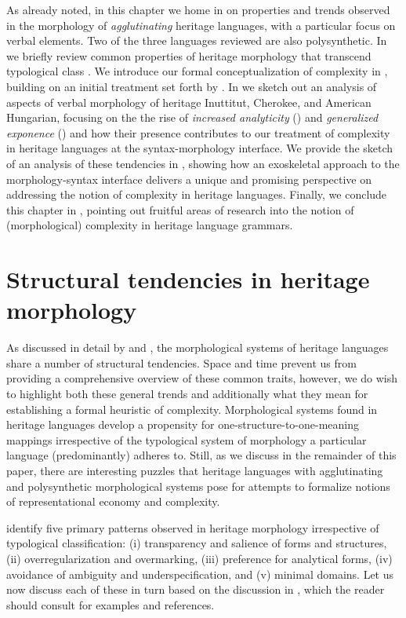 \documentclass[output=paper,colorlinks,citecolor=brown,footheight=42pt]{langscibook}
\begin{document}
As already noted, in this chapter we home in on properties and trends observed in the morphology of \textit{agglutinating} heritage languages, with a particular focus on verbal elements. Two of the three languages reviewed are also polysynthetic. In  we briefly review common properties of heritage morphology that transcend typological class \citep{polinsky2018heritage,putnametal2021}. We introduce our formal conceptualization of complexity in , building on an initial treatment set forth by \citet{lohnput21}. In  we sketch out an analysis of aspects of verbal morphology of heritage Inuttitut, Cherokee, and American Hungarian, focusing on the the rise of \textit{increased analyticity} () and \textit{generalized exponence} () and how their presence contributes to our treatment of complexity in heritage languages at the syntax-morphology interface. We provide the sketch of an analysis of these tendencies in , showing how an exoskeletal approach to the morphology-syntax interface delivers a unique and promising perspective on addressing the notion of complexity in heritage languages. Finally, we conclude this chapter in , pointing out fruitful areas of research into the notion of (morphological) complexity in heritage language grammars.

\section{Structural tendencies in heritage morphology} \label{common}
As discussed in detail by \citet[Ch. 5]{polinsky2018heritage} and \citet[\S 2]{putnametal2021}, the morphological systems of heritage languages share a number of structural tendencies. Space and time prevent us from providing a comprehensive overview of these common traits, however, we do wish to highlight both these general trends and additionally what they mean for establishing a formal heuristic of complexity. Morphological systems found in heritage languages develop a propensity for one-structure-to-one-meaning mappings irrespective of the typological system of morphology a particular language (predominantly) adheres to. Still, as we discuss in the remainder of this paper, there are interesting puzzles that heritage languages with agglutinating and polysynthetic morphological systems pose for attempts to formalize notions of representational economy and complexity. 

\citet{putnametal2021} identify five primary patterns observed in heritage morphology irrespective of typological classification: (i) transparency and salience of forms and structures, (ii) overregularization and overmarking, (iii) preference for analytical forms, (iv) avoidance of ambiguity and underspecification, and (v) minimal domains. Let us now discuss each of these in turn based on the discussion in \citet{putnametal2021}, which the reader should consult for examples and references.
\end{document}
